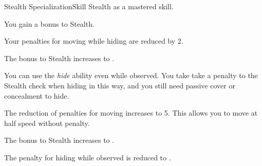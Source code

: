     \begin{feat}{Stealth Specialization}{Skill}
        \featpre Stealth as a mastered skill.

         You gain a  bonus to Stealth.

        \ff[2]{}

         Your penalties for moving while hiding are reduced by 2. 

         The bonus to Stealth increases to .

         You can use the \textit{hide} ability even while observed.
        You take take a  penalty to the Stealth check when hiding in this way, and you still need passive cover or concealment to hide.

         The reduction of penalties for moving increases to 5.
        This allows you to move at half speed without penalty.

         The bonus to Stealth increases to .

         The penalty for hiding while observed is reduced to .
    \end{feat}

